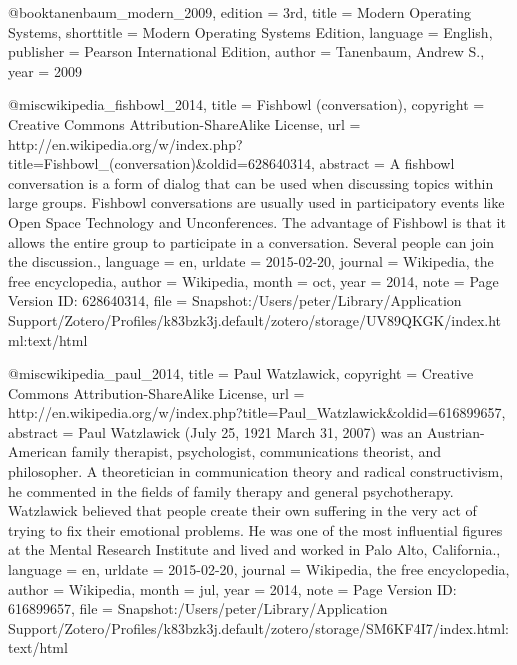 {@book{tanenbaum_modern_2009,
	edition = {3rd},
	title = {Modern {Operating} {Systems}},
	shorttitle = {Modern {Operating} {Systems} {Edition}},
	language = {English},
	publisher = {Pearson International Edition},
	author = {Tanenbaum, Andrew S.},
	year = {2009}
}

@misc{wikipedia_fishbowl_2014,
	title = {Fishbowl (conversation)},
	copyright = {Creative Commons Attribution-ShareAlike License},
	url = {http://en.wikipedia.org/w/index.php?title=Fishbowl_(conversation)&oldid=628640314},
	abstract = {A fishbowl conversation is a form of dialog that can be used when discussing topics within large groups. Fishbowl conversations are usually used in participatory events like Open Space Technology and Unconferences. The advantage of Fishbowl is that it allows the entire group to participate in a conversation. Several people can join the discussion.},
	language = {en},
	urldate = {2015-02-20},
	journal = {Wikipedia, the free encyclopedia},
	author = {{Wikipedia}},
	month = oct,
	year = {2014},
	note = {Page Version ID: 628640314},
	file = {Snapshot:/Users/peter/Library/Application Support/Zotero/Profiles/k83bzk3j.default/zotero/storage/UV89QKGK/index.html:text/html}
}

@misc{wikipedia_paul_2014,
	title = {Paul {Watzlawick}},
	copyright = {Creative Commons Attribution-ShareAlike License},
	url = {http://en.wikipedia.org/w/index.php?title=Paul_Watzlawick&oldid=616899657},
	abstract = {Paul Watzlawick (July 25, 1921 {\textendash} March 31, 2007) was an Austrian-American family therapist, psychologist, communications theorist, and philosopher. A theoretician in communication theory and radical constructivism, he commented in the fields of family therapy and general psychotherapy. Watzlawick believed that people create their own suffering in the very act of trying to fix their emotional problems. He was one of the most influential figures at the Mental Research Institute and lived and worked in Palo Alto, California.},
	language = {en},
	urldate = {2015-02-20},
	journal = {Wikipedia, the free encyclopedia},
	author = {{Wikipedia}},
	month = jul,
	year = {2014},
	note = {Page Version ID: 616899657},
	file = {Snapshot:/Users/peter/Library/Application Support/Zotero/Profiles/k83bzk3j.default/zotero/storage/SM6KF4I7/index.html:text/html}
}

}
